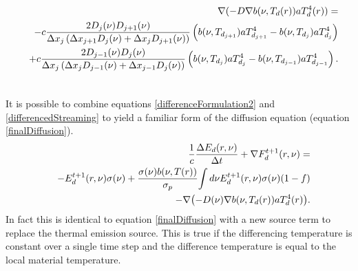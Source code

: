 	\begin{eqnarray}
	\label{differencedStreaming}
	&&\nabla{(-D\nabla{b(\nu,T_d(r))}aT_d^4(r))}=\nonumber \\ & &
	-c{2D_j(\nu)D_{j+1}(\nu)\over{\Delta{x_j}\left(\Delta{x_{j+1}}D_j(\nu)+\Delta{x_{j}}D_{j+1}(\nu)\right)}}\left(b(\nu,T_{d_{j+1}})aT_{d_{j+1}}^4-b(\nu,T_{d_{j}})aT_{d_{j}}^4\right)\nonumber \\ & & +c{2D_{j-1}(\nu)D_{j}(\nu)\over{\Delta{x_j}\left(\Delta{x_{j}}D_{j-1}(\nu)+\Delta{x_{j-1}}D_{j}(\nu)\right)}}\left(b(\nu,T_{d_{j}})aT_{d_{j}}^4-b(\nu,T_{d_{j-1}})aT_{d_{j-1}}^4\right).\nonumber \\& &
	\end{eqnarray}

	It is possible to combine equations \ref{differenceFormulation2} and \ref{differencedStreaming} to yield a familiar form of the diffusion equation (equation \ref{finalDiffusion}). 
	\begin{eqnarray}
	\label{differenceFormulation3}
	& &{1\over{c}}{\Delta{E_d(r,\nu)}\over{\Delta{t}}} + \nabla{F^{t+1}_{d}(r,\nu)}=\nonumber \\& & -E^{t+1}_{d}(r,\nu)\sigma(\nu)+{\sigma(\nu)b(\nu,T(r))\over{\sigma_p}}{\int{d\nu}E^{t+1}_{d}(r,\nu)\sigma(\nu)(1-f)}\nonumber \\& &
	- \nabla{\left(-D(\nu)\nabla{b(\nu,T_d(r))}aT_d^4(r)\right)}.
	\end{eqnarray}
	In fact this is identical to equation \ref{finalDiffusion} with a new source term to replace the thermal emission source. This is true if the differencing temperature is constant over a single time step and the difference temperature is equal to the local material temperature. 

